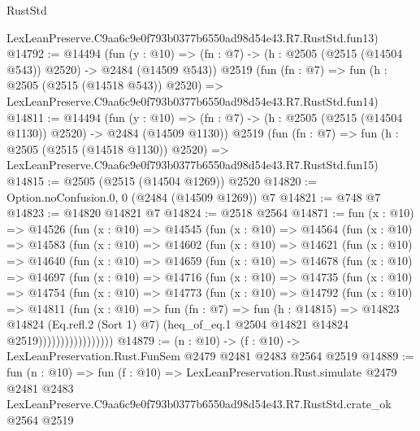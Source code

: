 \begin{lexlean}{RustStd}
\begin{coremodule}
    LexLeanPreserve.C9aa6c9e0f793b0377b6550ad98d54e43.R7.RustStd.fun13)
@14792 := @14494
    (fun (y : @10) => (fn : @7) -> (h : @2505 (@2515 (@14504 @543)) @2520) -> @2484 (@14509 @543))
    @2519
    (fun (fn : @7) =>
    fun (h : @2505 (@2515 (@14518 @543)) @2520) =>
    LexLeanPreserve.C9aa6c9e0f793b0377b6550ad98d54e43.R7.RustStd.fun14)
@14811 := @14494
    (fun (y : @10) => (fn : @7) -> (h : @2505 (@2515 (@14504 @1130)) @2520) -> @2484 (@14509 @1130))
    @2519
    (fun (fn : @7) =>
    fun (h : @2505 (@2515 (@14518 @1130)) @2520) =>
    LexLeanPreserve.C9aa6c9e0f793b0377b6550ad98d54e43.R7.RustStd.fun15)
@14815 := @2505 (@2515 (@14504 @1269)) @2520
@14820 := Option.noConfusion.{0, 0} (@2484 (@14509 @1269)) @7
@14821 := @748 @7
@14823 := @14820 @14821 @7
@14824 := @2518 @2564
@14871 := fun (x : @10) =>
  @14526
    (fun (x : @10) =>
    @14545
      (fun (x : @10) =>
      @14564
        (fun (x : @10) =>
        @14583
          (fun (x : @10) =>
          @14602
            (fun (x : @10) =>
            @14621
              (fun (x : @10) =>
              @14640
                (fun (x : @10) =>
                @14659
                  (fun (x : @10) =>
                  @14678
                    (fun (x : @10) =>
                    @14697
                      (fun (x : @10) =>
                      @14716
                        (fun (x : @10) =>
                        @14735
                          (fun (x : @10) =>
                          @14754
                            (fun (x : @10) =>
                            @14773
                              (fun (x : @10) =>
                              @14792
                                (fun (x : @10) =>
                                @14811
                                  (fun (x : @10) =>
                                  fun (fn : @7) =>
                                  fun (h : @14815) =>
                                  @14823
                                    @14824
                                    (Eq.refl.{2} (Sort 1) @7)
                                    (heq_of_eq.{1} @2504 @14821 @14824 @2519)))))))))))))))))
@14879 := (n : @10) -> (f : @10) -> LexLeanPreservation.Rust.FunSem @2479 @2481 @2483 @2564 @2519
@14889 := fun (n : @10) =>
  fun (f : @10) =>
  LexLeanPreservation.Rust.simulate
    @2479
    @2481
    @2483
    LexLeanPreserve.C9aa6c9e0f793b0377b6550ad98d54e43.R7.RustStd.crate_ok
    @2564
    @2519
\end{coremodule}
\end{lexlean}
